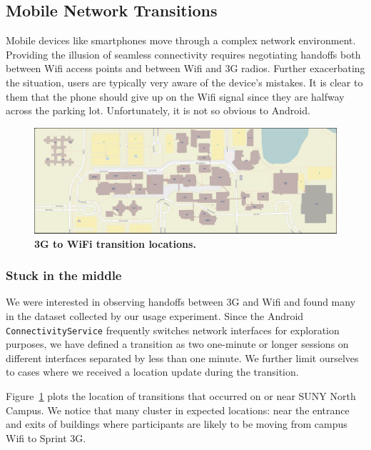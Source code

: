 \subsection{Mobile Network Transitions}
\label{subsec-networktransitions}

Mobile devices like smartphones move through a complex network environment.
Providing the illusion of seamless connectivity requires negotiating handoffs
both between Wifi access points and between Wifi and 3G radios. Further
exacerbating the situation, users are typically very aware of the device's
mistakes. It is clear to them that the phone should give up on the Wifi
signal since they are halfway across the parking lot. Unfortunately, it is
not so obvious to Android.

\begin{figure}[t]
\includegraphics[width=\textwidth]{./figures/networking/transition_locations/graph.pdf}
\caption{\textbf{3G to WiFi transition locations.}}
\label{figure-networktransitions}
\end{figure}

\subsubsection{Stuck in the middle}

We were interested in observing handoffs between 3G and Wifi and found many
in the dataset collected by our usage experiment. Since the Android
\texttt{ConnectivityService} frequently switches network interfaces for
exploration purposes, we have defined a transition as two one-minute or
longer sessions on different interfaces separated by less than one minute. We
further limit ourselves to cases where we received a location update during
the transition.

Figure~\ref{figure-networktransitions} plots the location of transitions that
occurred on or near SUNY North Campus. We notice that many cluster in
expected locations: near the entrance and exits of buildings where
participants are likely to be moving from campus Wifi to Sprint 3G.

